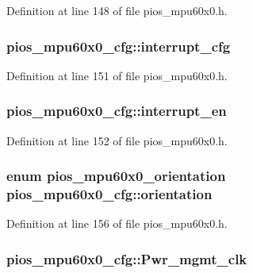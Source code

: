 Definition at line 148 of file pios\-\_\-mpu60x0.\-h.

\hypertarget{structpios__mpu60x0__cfg_aeadd184c43fe44f818bba2b94d80e099}{
\subsubsection[{interrupt\-\_\-cfg}]{ pios\-\_\-mpu60x0\-\_\-cfg\-::interrupt\-\_\-cfg}}\label{structpios__mpu60x0__cfg_aeadd184c43fe44f818bba2b94d80e099}


Definition at line 151 of file pios\-\_\-mpu60x0.\-h.

\hypertarget{structpios__mpu60x0__cfg_a34f330d80ad1406663dbe14f1ae362cd}{
\subsubsection[{interrupt\-\_\-en}]{ pios\-\_\-mpu60x0\-\_\-cfg\-::interrupt\-\_\-en}}\label{structpios__mpu60x0__cfg_a34f330d80ad1406663dbe14f1ae362cd}


Definition at line 152 of file pios\-\_\-mpu60x0.\-h.

\hypertarget{structpios__mpu60x0__cfg_a43ab1b1e72abc2f1fcf722afefa92dc1}{
\subsubsection[{orientation}]{\setlength{\rightskip}{0pt plus 5cm}enum {\bf pios\-\_\-mpu60x0\-\_\-orientation} pios\-\_\-mpu60x0\-\_\-cfg\-::orientation}}\label{structpios__mpu60x0__cfg_a43ab1b1e72abc2f1fcf722afefa92dc1}


Definition at line 156 of file pios\-\_\-mpu60x0.\-h.

\hypertarget{structpios__mpu60x0__cfg_ad4ef97a93c0b2cfc7e71652b2ec8c546}{
\subsubsection[{Pwr\-\_\-mgmt\-\_\-clk}]{ pios\-\_\-mpu60x0\-\_\-cfg\-::\-Pwr\-\_\-mgmt\-\_\-clk}}\label{structpios__mpu60x0__cfg_ad4ef97a93c0b2cfc7e71652b2ec8c546}


